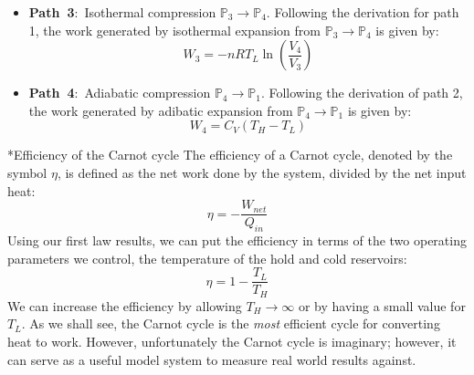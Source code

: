 \documentclass[11pt]{article}
\makeatletter
\theoremstyle{definition}
\renewcommand\subsection{\@startsection
	{subsection}{2}{0mm}
	{-0.05in}
	{0.5\baselineskip}
	{\normalfont\normalsize\bfseries}}
\makeatother
\begin{document}
\begin{itemize}
\item{\textbf{Path~3}:~Isothermal compression $\mathbb{P}_{3}\rightarrow\mathbb{P}_{4}$.
Following the derivation for path 1, the work generated by isothermal expansion from $\mathbb{P}_{3}\rightarrow\mathbb{P}_{4}$ is given by:
\begin{equation}
W_{3} = - nRT_{L}\ln\left(\frac{V_{4}}{V_{3}}\right)
\end{equation}}

\item{\textbf{Path~4}:~Adiabatic compression $\mathbb{P}_{4}\rightarrow\mathbb{P}_{1}$.
Following the derivation of path 2, the work generated by adibatic expansion from $\mathbb{P}_{4}\rightarrow\mathbb{P}_{1}$ is given by:
\begin{equation}
W_{4} = C_{V}\left(T_{H} - T_{L}\right)
\end{equation}}
\end{itemize}

\subsection*{Efficiency of the Carnot cycle}
The efficiency of a Carnot cycle, denoted by the symbol $\eta$, is defined as the net work done by the system, divided by the net input heat:
\begin{equation}
\eta = -\frac{W_{net}}{Q_{in}}
\end{equation}Using our first law results, we can put the efficiency in terms of the two operating parameters we control, the temperature of the
hold and cold reservoirs:
\begin{equation}\label{eqn:carnot-efficinecy}
\eta = 1 - \frac{T_{L}}{T_{H}}
\end{equation}We can increase the efficiency by allowing $T_{H}\rightarrow\infty$ or by having a small value for $T_{L}$.
As we shall see, the Carnot cycle is the \textit{most} efficient cycle for converting heat to work.
However, unfortunately the Carnot cycle is imaginary; however, it can serve as a useful model system to measure real world results against.
\end{document}
